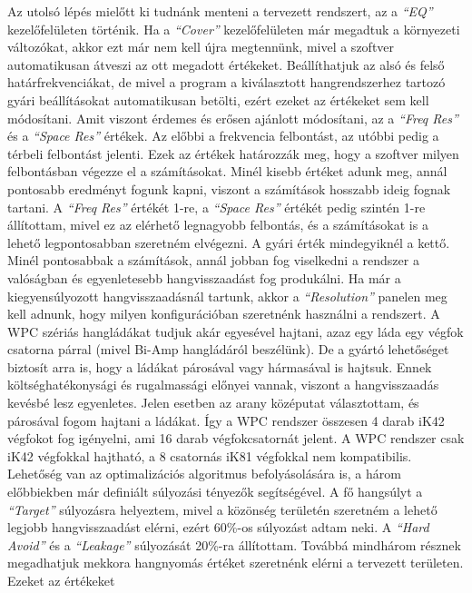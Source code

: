 Az utolsó lépés mielőtt ki tudnánk menteni a tervezett rendszert, az a \textit{``EQ''} kezelőfelületen történik.
Ha a \textit{``Cover''} kezelőfelületen már megadtuk a környezeti változókat, akkor ezt már nem kell újra megtennünk,
mivel a szoftver automatikusan átveszi az ott megadott értékeket. Beállíthatjuk az alsó és felső határfrekvenciákat, de mivel
a program a kiválasztott hangrendszerhez tartozó gyári beállításokat automatikusan betölti, ezért ezeket az értékeket sem kell módosítani.
Amit viszont érdemes és erősen ajánlott módosítani, az a \textit{``Freq Res''} és a \textit{``Space Res''} értékek. Az előbbi a
frekvencia felbontást, az utóbbi pedig a térbeli felbontást jelenti. Ezek az értékek határozzák meg, hogy a szoftver milyen 
felbontásban végezze el a számításokat. Minél kisebb értéket adunk meg, annál pontosabb eredményt fogunk kapni, viszont a számítások
hosszabb ideig fognak tartani. A \textit{``Freq Res''} értékét 1-re, a \textit{``Space Res''} értékét pedig szintén 1-re állítottam, mivel
ez az elérhető legnagyobb felbontás, és a számításokat is a lehető legpontosabban szeretném elvégezni. A gyári érték mindegyiknél a kettő.
Minél pontosabbak a számítások, annál jobban fog viselkedni a rendszer a valóságban és egyenletesebb hangvisszaadást fog produkálni.
Ha már a kiegyensúlyozott hangvisszaadásnál tartunk, akkor a \textit{``Resolution''} panelen meg kell adnunk, hogy milyen
konfigurációban szeretnénk használni a rendszert. A WPC szériás hangládákat tudjuk akár egyesével hajtani, azaz egy láda egy végfok csatorna
párral (mivel Bi-Amp hangládáról beszélünk). De a gyártó lehetőséget biztosít arra is, hogy a ládákat párosával vagy hármasával is hajtsuk.
Ennek költséghatékonysági és rugalmassági előnyei vannak, viszont a hangvisszaadás kevésbé lesz egyenletes. Jelen esetben 
az arany középutat választottam, és párosával fogom hajtani a ládákat. Így a WPC rendszer összesen 4 darab iK42 végfokot fog igényelni, ami 
16 darab végfokcsatornát jelent. A WPC rendszer csak iK42 végfokkal hajtható, a 8 csatornás iK81 végfokkal nem kompatibilis.
Lehetőség van az optimalizációs algoritmus befolyásolására is, a három előbbiekben már definiált súlyozási tényezők segítségével.
A fő hangsúlyt a \textit{``Target''} súlyozásra helyeztem, mivel a közönség területén szeretném a lehető legjobb hangvisszaadást elérni,
ezért 60\%-os súlyozást adtam neki.
A \textit{``Hard Avoid''} és a \textit{``Leakage''} súlyozását 20\%-ra állítottam.
Továbbá mindhárom résznek megadhatjuk mekkora hangnyomás értéket szeretnénk elérni a tervezett területen. Ezeket az értékeket

